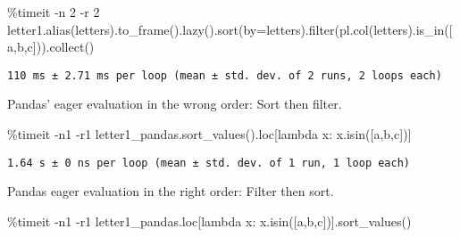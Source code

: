 \documentclass[
  letterpaper,
  DIV=11,
  numbers=noendperiod]{scrartcl}
\newenvironment{Shaded}{\begin{snugshade}}{\end{snugshade}}
\newcommand{\BuiltInTok}[1]{\textcolor[rgb]{0.00,0.23,0.31}{#1}}
\newcommand{\DecValTok}[1]{\textcolor[rgb]{0.68,0.00,0.00}{#1}}
\newcommand{\KeywordTok}[1]{\textcolor[rgb]{0.00,0.23,0.31}{#1}}
\newcommand{\NormalTok}[1]{\textcolor[rgb]{0.00,0.23,0.31}{#1}}
\newcommand{\OperatorTok}[1]{\textcolor[rgb]{0.37,0.37,0.37}{#1}}
\newcommand{\StringTok}[1]{\textcolor[rgb]{0.13,0.47,0.30}{#1}}
\begin{document}
\begin{Shaded}
\begin{Highlighting}[]
\OperatorTok{\%}\NormalTok{timeit }\OperatorTok{{-}}\NormalTok{n }\DecValTok{2} \OperatorTok{{-}}\NormalTok{r }\DecValTok{2}\NormalTok{ letter1.alias(}\StringTok{\textquotesingle{}letters\textquotesingle{}}\NormalTok{).to\_frame().lazy().sort(by}\OperatorTok{=}\StringTok{\textquotesingle{}letters\textquotesingle{}}\NormalTok{).}\BuiltInTok{filter}\NormalTok{(pl.col(}\StringTok{\textquotesingle{}letters\textquotesingle{}}\NormalTok{).is\_in([}\StringTok{\textquotesingle{}a\textquotesingle{}}\NormalTok{,}\StringTok{\textquotesingle{}b\textquotesingle{}}\NormalTok{,}\StringTok{\textquotesingle{}c\textquotesingle{}}\NormalTok{])).collect()}
\end{Highlighting}
\end{Shaded}

\begin{verbatim}
110 ms ± 2.71 ms per loop (mean ± std. dev. of 2 runs, 2 loops each)
\end{verbatim}

Pandas' eager evaluation in the wrong order: Sort then filter.

\begin{Shaded}
\begin{Highlighting}[]
\OperatorTok{\%}\NormalTok{timeit }\OperatorTok{{-}}\NormalTok{n1 }\OperatorTok{{-}}\NormalTok{r1 letter1\_pandas.sort\_values().loc[}\KeywordTok{lambda}\NormalTok{ x: x.isin([}\StringTok{\textquotesingle{}a\textquotesingle{}}\NormalTok{,}\StringTok{\textquotesingle{}b\textquotesingle{}}\NormalTok{,}\StringTok{\textquotesingle{}c\textquotesingle{}}\NormalTok{])]}
\end{Highlighting}
\end{Shaded}

\begin{verbatim}
1.64 s ± 0 ns per loop (mean ± std. dev. of 1 run, 1 loop each)
\end{verbatim}

Pandas eager evaluation in the right order: Filter then sort.

\begin{Shaded}
\begin{Highlighting}[]
\OperatorTok{\%}\NormalTok{timeit }\OperatorTok{{-}}\NormalTok{n1 }\OperatorTok{{-}}\NormalTok{r1 letter1\_pandas.loc[}\KeywordTok{lambda}\NormalTok{ x: x.isin([}\StringTok{\textquotesingle{}a\textquotesingle{}}\NormalTok{,}\StringTok{\textquotesingle{}b\textquotesingle{}}\NormalTok{,}\StringTok{\textquotesingle{}c\textquotesingle{}}\NormalTok{])].sort\_values()}
\end{Highlighting}
\end{Shaded}
\end{document}

